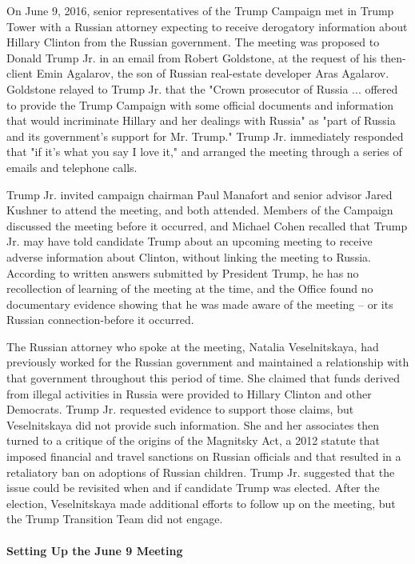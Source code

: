 On June 9, 2016, senior representatives of the Trump Campaign met in Trump Tower with a Russian attorney expecting to receive derogatory information about Hillary Clinton from the Russian government.
The meeting was proposed to Donald Trump Jr. in an email from Robert Goldstone, at the request of his then-client Emin Agalarov, the son of Russian real-estate developer Aras Agalarov.
Goldstone relayed to Trump Jr. that the "Crown prosecutor of Russia ... offered to provide the Trump Campaign with some official documents and information that would incriminate Hillary and her dealings with Russia" as "part of Russia and its government's support for Mr. Trump."
Trump Jr. immediately responded that "if it's what you say I love it," and arranged the meeting through a series of emails and telephone calls.

Trump Jr. invited campaign chairman Paul Manafort and senior advisor Jared Kushner to attend the meeting, and both attended.
Members of the Campaign discussed the meeting before it occurred, and Michael Cohen recalled that Trump Jr. may have told candidate Trump about an upcoming meeting to receive adverse information about Clinton, without linking the meeting to Russia.
According to written answers submitted by President Trump, he has no recollection of learning of the meeting at the time, and the Office found no documentary evidence showing that he was made aware of the meeting -- or its Russian connection-before it occurred.

The Russian attorney who spoke at the meeting, Natalia Veselnitskaya, had previously worked for the Russian government and maintained a relationship with that government throughout this period of time.
She claimed that funds derived from illegal activities in Russia were provided to Hillary Clinton and other Democrats.
Trump Jr. requested evidence to support those claims, but Veselnitskaya did not provide such information.
She and her associates then turned to a critique of the origins of the Magnitsky Act, a 2012 statute that imposed financial and travel sanctions on Russian officials and that resulted in a retaliatory ban on adoptions of Russian children.
Trump Jr. suggested that the issue could be revisited when and if candidate Trump was elected.
After the election, Veselnitskaya made additional efforts to follow up on the meeting, but the Trump Transition Team did not engage.

\paragraph{Setting Up the June 9 Meeting}

